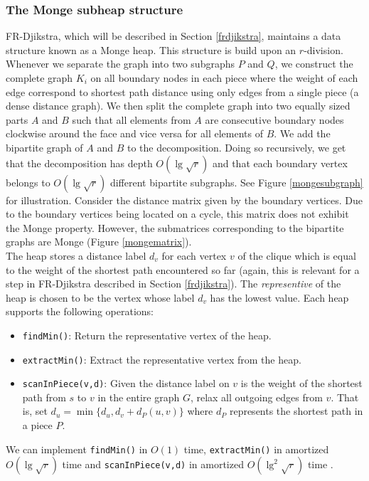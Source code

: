 \subsubsection{The Monge subheap structure}\label{mongeheap}
FR-Djikstra, which will be described in Section \ref{frdjikstra}, maintains a data
structure known as a Monge heap. This structure is build upon an $r$-division. Whenever we separate the graph into two
subgraphs $P$ and $Q$, we construct the complete graph $K_i$ on all boundary nodes in
each piece where the weight of each edge correspond to shortest path distance using
only edges from a single piece (a dense distance graph). We then split the complete graph into two equally
sized parts $A$
and $B$ such that all elements from $A$ are consecutive boundary nodes clockwise around
the face and vice versa for all elements of $B$. We add the bipartite graph of $A$ and $B$ to
the decomposition. Doing so recursively, we get that the decomposition has depth $O(\lg
\sqrt{r})$ and that each boundary vertex belongs to $O(\lg \sqrt{r})$ different bipartite
subgraphs. See Figure \ref{mongesubgraph} for illustration. Consider the distance matrix
given by the boundary vertices. Due to the boundary vertices being located on a cycle, this matrix
does not exhibit the Monge property. However, the submatrices corresponding to the
bipartite graphs are Monge (Figure \ref{mongematrix}). \\
The heap stores a distance label $d_v$ for each vertex $v$ of the
clique which is equal to the weight of the shortest path encountered so far (again, this is
relevant for a step in FR-Djikstra described in Section \ref{frdjikstra}). The
\textit{representive} of the heap is chosen to be the vertex whose label $d_v$ has the lowest
value. Each heap supports the following operations:
\begin{itemize}
  \item \texttt{findMin()}: Return the representative vertex of the heap.
  \item \texttt{extractMin()}: Extract the representative vertex from the heap.
  \item \texttt{scanInPiece(v,d)}: Given the distance label on $v$ is the weight of the
    shortest path from $s$ to $v$ in the entire graph $G$, relax all outgoing edges from $v$.
    That is, set $d_u=\min\{d_u, d_v+d_P(u,v)\}$ where $d_P$ represents the shortest path
    in a piece $P$.
\end{itemize}
We can implement \texttt{findMin()} in $O(1)$ time, \texttt{extractMin()} in amortized
$O(\lg \sqrt{r})$ time and \texttt{scanInPiece(v,d)} in amortized $O(\lg^2 \sqrt{r})$
time \cite{fakcharoenphol2006planar}.

